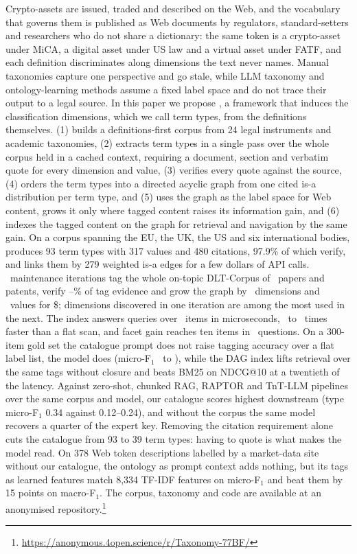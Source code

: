 Crypto-assets are issued, traded and described on the Web, and the vocabulary
that governs them is published as Web documents by regulators, standard-setters
and researchers who do not share a dictionary: the same token is a crypto-asset
under MiCA, a digital asset under US law and a virtual asset under FATF, and
each definition discriminates along dimensions the text never names. Manual
taxonomies capture one perspective and go stale, while LLM taxonomy and
ontology-learning methods assume a fixed label space and do not trace their
output to a legal source. In this paper we
propose \sys, a framework that induces the classification dimensions, which we
call term types, from the definitions themselves. \sys (1) builds a
definitions-first corpus from 24 legal instruments and academic taxonomies,
(2) extracts term types in a single pass over the whole corpus held in a cached
context, requiring a document, section and verbatim quote for every dimension
and value, (3) verifies every quote against the source, (4) orders the term types into a directed acyclic graph from one cited
is-a distribution per term type, and (5) uses the graph as the label
space for Web content, grows it only where tagged content raises its
information gain, and (6) indexes the tagged content on the graph for
retrieval and navigation by the same gain. On a corpus spanning the EU, the UK, the
US and six international bodies, \sys produces 93 term types with 317 values and
480 citations, 97.9\% of which verify, and links them by 279 weighted is-a
edges for a few dollars of API calls. \NIterCap\ maintenance iterations tag the whole on-topic DLT-Corpus of
\AllItems\ papers and patents, verify \EvidMin--\EvidMax\% of tag evidence and
grow the graph by \AllAddedTypes\ dimensions and \AllAddedValues\ values for
\$\AllCost; dimensions discovered in one iteration are among the most used
in the next. The index answers queries
over \RItems\ items in microseconds, \RSpeedMin\ to \RSpeedMax\ times faster
than a flat scan, and facet gain reaches ten items in \RGainSteps\ questions. On a 300-item gold set the catalogue prompt does not raise tagging
accuracy over a flat label list, the model does (micro-F$_1$ \DagMicro\ to
\SonMicro), while the DAG index lifts retrieval over the same tags without
closure and beats BM25 on NDCG@10 at a twentieth of the latency. Against
zero-shot, chunked RAG, RAPTOR and TnT-LLM pipelines over the same corpus and
model, our catalogue scores highest downstream (type micro-F$_1$ 0.34 against
0.12--0.24), and without the corpus the same model recovers a quarter of the
expert key. Removing the citation requirement alone cuts the catalogue from
93 to 39 term types: having to quote is what makes the model read. On 378 Web token descriptions
labelled by a market-data site without our catalogue, the ontology as prompt
context adds nothing, but its tags as learned features match 8,334 TF-IDF
features on micro-F$_1$ and beat them by 15 points on macro-F$_1$. The corpus, taxonomy and code are available at an anonymised repository.\footnote{\url{https://anonymous.4open.science/r/Taxonomy-77BF/}}
